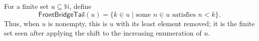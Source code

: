 \begin{definition}
For a finite set $u\subseteq\mathbb N$, define
\[
  \mathsf{FrontBridgeTail}(u)=
  \{k\in u\mid \text{some }n\in u\text{ satisfies }n<k\}.
\]
Thus, when $u$ is nonempty, this is $u$ with its least element removed;
it is the finite set seen after applying the shift to the increasing
enumeration of $u$.
\end{definition}
